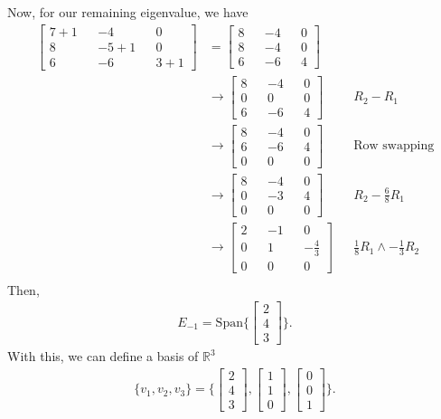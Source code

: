 \documentclass[10pt,a4paper]{article}
\theoremstyle{definition}
\begin{document}
Now, for our remaining eigenvalue, we have 
\begin{align*}
\begin{bmatrix}
7 + 1 && -4 && 0\\
8 && -5 + 1 && 0\\
6 && -6 && 3 + 1
\end{bmatrix} &= \begin{bmatrix}
8 && -4 && 0\\
8 && -4 && 0\\
6 && -6 && 4
\end{bmatrix}\\
&\to \begin{bmatrix}
8 && -4 && 0\\
0 && 0 && 0\\
6 && -6 && 4
\end{bmatrix} && R_2 - R_1\\
&\to \begin{bmatrix}
8 && -4 && 0\\
6 && -6 && 4\\
0 && 0 && 0
\end{bmatrix} && \text{Row swapping}\\
&\to \begin{bmatrix}
8 && -4 && 0\\
0 && -3 && 4\\
0 && 0 && 0
\end{bmatrix} && R_2 - \frac{6}{8}R_1\\
&\to \begin{bmatrix}
2 && -1 && 0\\
0 && 1 && -\frac{4}{3}\\
0 && 0 && 0
\end{bmatrix} && \frac{1}{8}R_1 \land -\frac{1}{3}R_2\\
\end{align*}
Then,
\begin{align*}
E_{-1} = \text{Span} \Biggl\{ \begin{bmatrix}
2\\
4\\
3
\end{bmatrix} \Biggr\}.
\end{align*}
With this, we can define a basis of $\mathbb{R}^3$
\begin{align*}
\{v_1, v_2, v_3 \} = \Biggl\{ \begin{bmatrix}
2\\
4\\
3
\end{bmatrix} , \begin{bmatrix}
1\\
1\\
0
\end{bmatrix} , \begin{bmatrix}
0\\
0\\
1
\end{bmatrix}\Biggr\}.
\end{align*}
\end{document}
